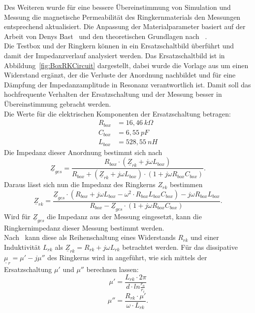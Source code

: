             \par
            Des Weiteren wurde für eine bessere Übereinstimmung von Simulation und Messung die magnetische Permeabilität des Ringkernmaterials den Messungen entsprechend aktualisiert. Die Anpassung der Materialparameter basiert auf der Arbeit von Denys Bast~\citep{bast2017ba} und den theoretischen Grundlagen nach ~\citep{Klingbeil2008}.\\
            Die Testbox und der Ringkern können in ein Ersatzschaltbild überführt und damit der Impedanzverlauf analysiert werden. Das Ersatzschaltbild ist in Abbildung~\ref{fig:BoxRKCircuit} dargestellt, dabei wurde die Vorlage aus \citep{bast2017ba} um einen Widerstand ergänzt, der die Verluste der Anordnung nachbildet und für eine Dämpfung der Impedanzamplitude in Resonanz verantwortlich ist. Damit soll das hochfrequente Verhalten der Ersatzschaltung und der Messung besser in Übereinstimmung gebracht werden.\\
            Die Werte für die elektrischen Komponenten der Ersatzschaltung betragen:
                \begin{align}
                    R_{box} &= 16,46~k\Omega \nonumber\\
                    C_{box} &= 6,55~pF \nonumber\\
                    L_{box} &= 528,55~nH \nonumber
                \end{align}
            Die Impedanz dieser Anordnung bestimmt sich nach
                \begin{equation}\label{eq:Zges}
                    \underline{Z}_{ges} = \frac{R_{box}\cdot(\underline{Z}_{rk}+j\omega L_{box})}{R_{box}+(\underline{Z}_{rk}+j\omega L_{box})\cdot(1+j\omega R_{box}C_{box})}.
                \end{equation}
            Daraus lässt sich nun die Impedanz des Ringkerns $Z_{rk}$ bestimmen
                \begin{equation}\label{eq:Zrk}
                \underline{Z}_{rk} = \frac{\underline{Z}_{ges}\cdot(R_{box}+j\omega L_{box}-\omega^2\cdot R_{box}L_{box}C_{box}) - j\omega R_{box}L_{box}}{R_{box}-\underline{Z}_{ges}\cdot(1+j\omega R_{box}C_{box})}.
                \end{equation}
            Wird für $\underline{Z}_{ges}$ die Impedanz aus der Messung eingesetzt, kann die Ringkernimpedanz dieser Messung bestimmt werden.\\
            Nach~\citep{Klingbeil2008} kann diese als Reihenschaltung eines Widerstands $R_{rk}$ und einer Induktivität $L_{rk}$ als $\underline{Z}_{rk} = R_{rk}+j\omega L_{rk}$ betrachtet werden. Für das dissipative $\underline{\mu}_r = \mu' -j\mu''$  des Ringkerns wird in \citep{bast2017ba} angeführt, wie sich mittels der Ersatzschaltung $\mu'$ und $\mu''$ berechnen lassen:
                \begin{equation}
                    \mu' = \frac{L_{rk}\cdot 2\pi}{d\cdot ln\frac{r_a}{r_i}}
                \end{equation} 
                \begin{equation}
                \mu'' = \frac{R_{rk}\cdot\mu'}{\omega\cdot L_{rk}} .
                \end{equation}
            
